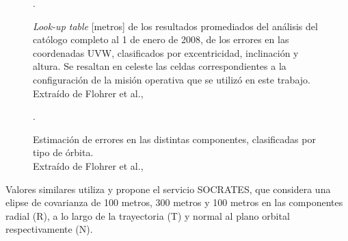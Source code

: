 \begin{figure}[!h]
  \centering
  \caption{{\it{Look-up table}} [metros] de los resultados promediados del an\'alisis del cat\'ologo completo al 1 de enero de 2008, de los errores en las coordenadas UVW, clasificados por excentricidad, inclinaci\'on y altura. Se resaltan en celeste las celdas correspondientes a la configuraci\'on de la misi\'on operativa que se utiliz\'o en este trabajo. Extra\'ido de Flohrer et al., \citep{flohrer2008assessment}}.
  \label{fig:flohrer}
\end{figure}

\begin{figure}[!h]
  \centering
  \caption{Estimaci\'on de errores en las distintas componentes, clasificadas por tipo de \'orbita. \\ Extra\'ido de Flohrer et al., \citep{flohrer2008assessment}}.
  \label{fig:flohrer2}
\end{figure}

Valores similares utiliza y propone el servicio SOCRATES, que considera una elipse de covarianza de 100 metros, 300 metros y 100 metros en las componentes radial (R), a lo largo de la trayectoria (T) y normal al plano orbital respectivamente (N).  

% 


